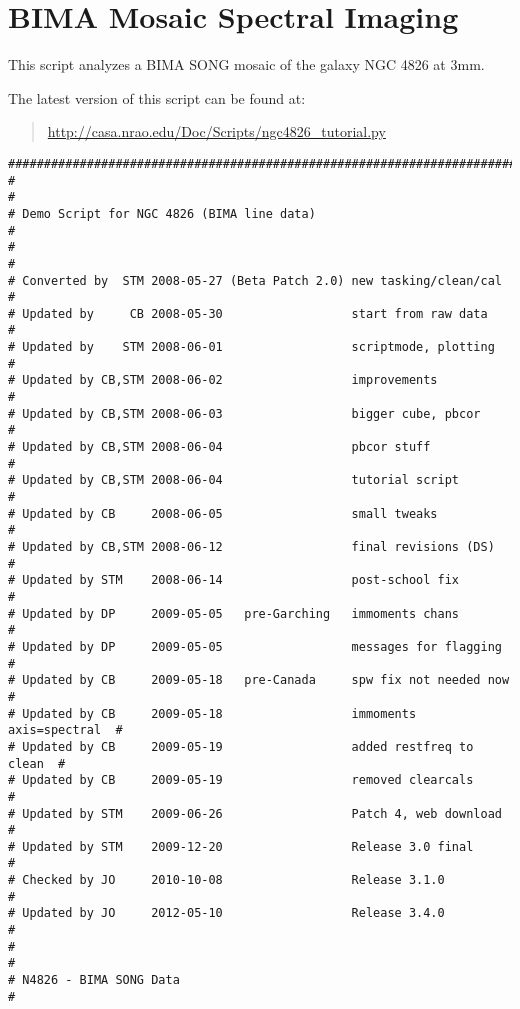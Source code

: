 \section{BIMA Mosaic Spectral Imaging}
\label{section:scripts.ngc4826}

This script analyzes a BIMA SONG mosaic of the galaxy NGC 4826
at 3mm.

The latest version of this script can be found at:
\begin{quote}
   \url{http://casa.nrao.edu/Doc/Scripts/ngc4826_tutorial.py}
\end{quote}

\small
\begin{verbatim}
##########################################################################
#                                                                        #
# Demo Script for NGC 4826 (BIMA line data)                              #
#                                                                        #
# Converted by  STM 2008-05-27 (Beta Patch 2.0) new tasking/clean/cal    #
# Updated by     CB 2008-05-30                  start from raw data      #
# Updated by    STM 2008-06-01                  scriptmode, plotting     #
# Updated by CB,STM 2008-06-02                  improvements             #
# Updated by CB,STM 2008-06-03                  bigger cube, pbcor       #
# Updated by CB,STM 2008-06-04                  pbcor stuff              #
# Updated by CB,STM 2008-06-04                  tutorial script          #
# Updated by CB     2008-06-05                  small tweaks             #
# Updated by CB,STM 2008-06-12                  final revisions (DS)     #
# Updated by STM    2008-06-14                  post-school fix          #
# Updated by DP     2009-05-05   pre-Garching   immoments chans          #
# Updated by DP     2009-05-05                  messages for flagging    #
# Updated by CB     2009-05-18   pre-Canada     spw fix not needed now   #
# Updated by CB     2009-05-18                  immoments axis=spectral  #
# Updated by CB     2009-05-19                  added restfreq to clean  #
# Updated by CB     2009-05-19                  removed clearcals        #
# Updated by STM    2009-06-26                  Patch 4, web download    #
# Updated by STM    2009-12-20                  Release 3.0 final        #
# Checked by JO     2010-10-08                  Release 3.1.0            #
# Updated by JO     2012-05-10                  Release 3.4.0            #
#                                                                        #
# N4826 - BIMA SONG Data                                                 #

\end{verbatim}
